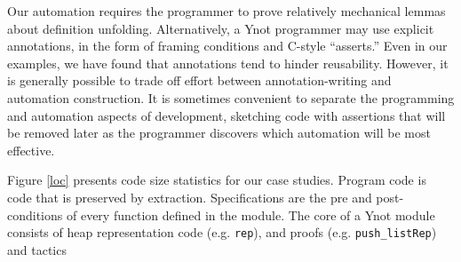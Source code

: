 \documentclass[preprint,nocopyrightspace]{sigplanconf}
\newcommand{\cd}[1]{\texttt{#1}}
\begin{document}
Our automation requires the programmer to prove relatively mechanical
lemmas about definition unfolding.  Alternatively, a Ynot programmer may use
explicit annotations, in the form of framing conditions and C-style
``asserts.''  Even in our examples, we have found that annotations
tend to hinder reusability.  However, it is generally possible to
trade off effort between annotation-writing and automation
construction.  It is sometimes convenient to separate the programming
and automation aspects of development, sketching code with assertions
that will be removed later as the programmer discovers which
automation will be most effective.

Figure \ref{loc} presents code size statistics for our case studies.
Program code is code that is preserved by extraction.
Specifications are the pre and post-conditions of every function
defined in the module.  The core of a Ynot module consists of heap representation code
(e.g. \cd{rep}), and proofs (e.g. \cd{push\_listRep}) and tactics
\end{document}
